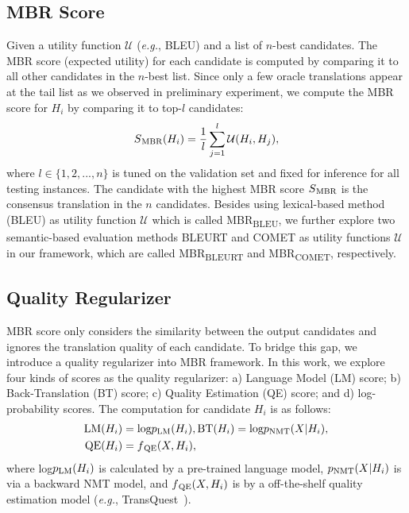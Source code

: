 \documentclass{article}
\begin{document}
\subsection{MBR Score}
\label{MBR Score}
Given a utility function $\mathcal{U}$ (\textit{e.g.}, BLEU) and a list of $n$-best candidates. The MBR score (expected utility) for each candidate is computed by comparing it to all other candidates in the $n$-best list. Since only a few oracle translations appear at the tail list as we observed in preliminary experiment, we compute the MBR score for $H_i$ by comparing it to top-$l$ candidates:
\begin{equation}
S\textsubscript{MBR}(H_i)= \frac{1}{l} \sum_{j=1}^{l} \mathcal{U}(H_i,H_j),
\end{equation}
where $l\in \{1,2,...,n\}$ is tuned on the validation set and fixed for inference for all testing instances. The candidate with the highest MBR score $S\textsubscript{MBR}$ is the consensus translation in the $n$ candidates. Besides using lexical-based method (BLEU) as utility function $\mathcal{U}$ which is called MBR\textsubscript{BLEU}, we further explore two semantic-based evaluation methods BLEURT and COMET as utility functions $\mathcal{U}$ in our framework, which are called MBR\textsubscript{BLEURT} and MBR\textsubscript{COMET}, respectively.

\subsection{Quality Regularizer}\label{sec:QR}
MBR score only considers the similarity between the output candidates and ignores the translation quality of each candidate. To bridge this gap, we introduce a quality regularizer into MBR framework. In this work, we explore four kinds of scores as the quality regularizer: a) Language Model (LM) score; b) Back-Translation (BT) score; c) Quality Estimation (QE) score; and d) log-probability scores. The computation for candidate $H_i$ is as follows:
\begin{align}
\text{LM}(H_i)&=\text{log} p\textsubscript{LM}(H_i), \text{BT}(H_i)=\text{log} p\textsubscript{NMT}(X|H_i), \\
\text{QE}(H_i)&=f\textsubscript{QE}(X,H_i),
\end{align}
where log$p\textsubscript{LM}(H_i)$ is calculated by a pre-trained language model, $p\textsubscript{NMT}(X|H_i)$ is via a backward NMT model, and $f\textsubscript{QE}(X,H_i)$ is by a off-the-shelf quality estimation model (\textit{e.g.}, TransQuest~\cite{50}).
\end{document}
